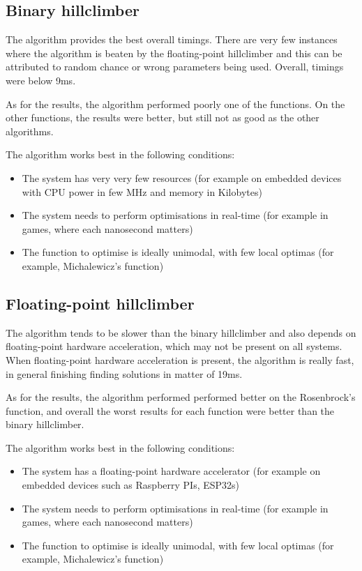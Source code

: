 \documentclass[conference]{IEEEtran}
\begin{document}
\subsection{Binary hillclimber}
The algorithm provides the best overall timings. There are very few instances where the algorithm is beaten by the floating-point
hillclimber and this can be attributed to random chance or wrong parameters being used. Overall, timings were below 9ms.

As for the results, the algorithm performed poorly one of the functions. On the other functions, the results were better,
but still not as good as the other algorithms.

The algorithm works best in the following conditions:
\begin{itemize}
    \item The system has very very few resources (for example on embedded devices with CPU power in few MHz and memory in Kilobytes)
    \item The system needs to perform optimisations in real-time (for example in games, where each nanosecond matters)
    \item The function to optimise is ideally unimodal, with few local optimas (for example, Michalewicz's function)
\end{itemize}

\subsection{Floating-point hillclimber}
The algorithm tends to be slower than the binary hillclimber and also depends on floating-point hardware acceleration, which
may not be present on all systems. When floating-point hardware acceleration is present, the algorithm is really fast, in general
finishing finding solutions in matter of 19ms.

As for the results, the algorithm performed performed better on the Rosenbrock's function, and overall the worst results
for each function were better than the binary hillclimber.

The algorithm works best in the following conditions:
\begin{itemize}
    \item The system has a floating-point hardware accelerator (for example on embedded devices such as Raspberry PIs, ESP32s)
    \item The system needs to perform optimisations in real-time (for example in games, where each nanosecond matters)
    \item The function to optimise is ideally unimodal, with few local optimas (for example, Michalewicz's function)
\end{itemize}
\end{document}

